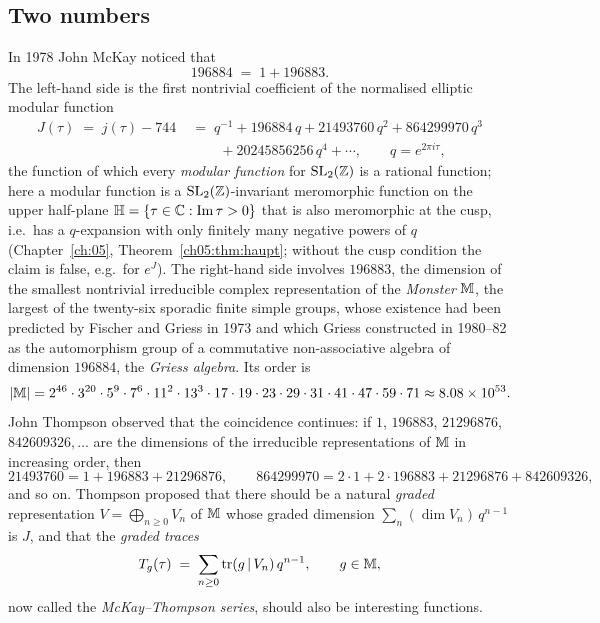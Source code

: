 \subsection{Two numbers}

In 1978 John McKay noticed that
\begin{equation}\label{ch16:eq:mckay}
  196884 \;=\; 1 + 196883 .
\end{equation}
The left-hand side is the first nontrivial coefficient of the normalised elliptic modular function
\begin{equation}\label{ch16:eq:J}
\begin{aligned}
  J(\tau) \;=\; j(\tau)-744 \;&=\; q^{-1} + 196884\,q + 21493760\,q^2 + 864299970\,q^3\\
  &\qquad + 20245856256\,q^4+\cdots,\qquad q=e^{2\pi i\tau},
\end{aligned}
\end{equation}
the function of which every \emph{modular function} for $\mathrm{SL}_2(\mathbb{Z})$ is a rational function; here a modular function is
a $\mathrm{SL}_2(\mathbb{Z})$-invariant meromorphic function on the upper half-plane $\mathbb{H}=\{\tau\in{\mathbb{C}}:\operatorname{Im}\tau>0\}$
that is also meromorphic at the cusp, i.e.\ has a $q$-expansion with only finitely many negative powers of $q$
(Chapter~\ref{ch:05}, Theorem~\ref{ch05:thm:haupt}; without the cusp condition the claim is false, e.g.\ for
$e^{J}$).  The
right-hand side involves $196883$, the dimension of the smallest nontrivial irreducible complex representation of
the \emph{Monster} $\mathbb{M}$, the largest of the twenty-six sporadic finite simple groups, whose existence had been
predicted by Fischer and Griess in 1973 and which Griess constructed in 1980--82 as the automorphism group of a
commutative non-associative algebra of dimension $196884$, the \emph{Griess algebra}.  Its order is
\begin{equation*}
  |\mathbb{M}| = 2^{46}\cdot3^{20}\cdot5^{9}\cdot7^{6}\cdot11^{2}\cdot13^{3}\cdot17\cdot19\cdot23\cdot29\cdot31\cdot41
  \cdot47\cdot59\cdot71\approx 8.08\times10^{53}.
\end{equation*}
John Thompson observed that the coincidence continues: if $1$, $196883$, $21296876$, $842609326,\dots$ are the
dimensions of the irreducible representations of $\mathbb{M}$ in increasing order, then
\begin{equation*}
  21493760 = 1+196883+21296876,\qquad 864299970 = 2\cdot1+2\cdot196883+21296876+842609326,
\end{equation*}
and so on.  Thompson proposed that there should be a natural \emph{graded} representation
$V=\bigoplus_{n\ge0}V_n$ of $\mathbb{M}$ whose graded dimension $\sum_n(\dim V_n)\,q^{n-1}$ is $J$, and that the
\emph{graded traces}
\begin{equation}\label{ch16:eq:Tg-intro}
  T_g(\tau) \;=\; \sum_{n\ge0}\operatorname{tr}(g\,|\,V_n)\,q^{n-1}, \qquad g\in\mathbb{M},
\end{equation}
now called the \emph{McKay--Thompson series}, should also be interesting functions.

